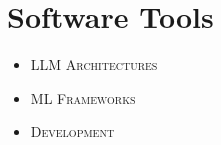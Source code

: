 \section*{Software Tools}

\begin{itemize}[leftmargin=\firstlistindent, labelsep = 0pt, align=center, labelwidth=\firstlistlabelsep, itemsep = 8pt]

\item[\faRobot] {\scshape LLM Architectures}
\begin{itemizeLL}
\end{itemizeLL}

\item[\faChartLine] {\scshape ML Frameworks}
\begin{itemizeLL}
\end{itemizeLL}

\item[\faCode] {\scshape Development}
\begin{itemizeLL}
\end{itemizeLL}

\end{itemize}
